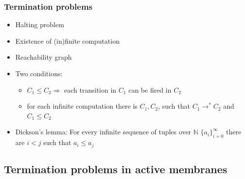     \begin{frame}[t]\frametitle{Termination problems}
      \begin{itemize}
        \item Halting problem
        \pause
        \item Existence of (in)finite computation
        \pause
        \item Reachability graph
        \pause
        \item Two conditions:
        \begin{itemize}
          \item $C_1 \leq C_2 \Rightarrow$ each transition in $C_1$ can be fired in $C_2$
          \pause
          \item for each infinite computation there is $C_1, C_2$, such that $C_1 \rightarrow^* C_2$ and $C_1 \leq C_2$
        \end{itemize}
        \pause
        \item Dickson's lemma: For every infinite sequence of tuples over $\mathbb{N}$ $\{a_i\}_{i=0}^\infty$ there are $i<j$ such that $a_i\leq a_j$
      \end{itemize}

    \end{frame}
    \note{}



  \subsection{Termination problems in active membranes} %
  \label{sub:termination_problems_in_active_membranes}

